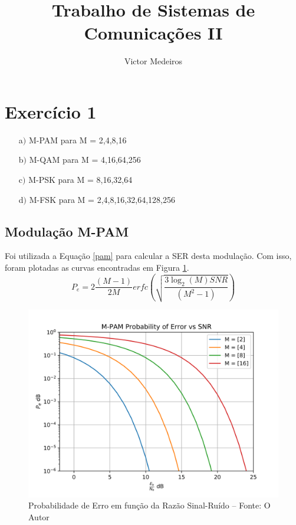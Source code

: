 \documentclass[10pt,two column,a4paper]{article}
\author{Victor Medeiros}
\title{Trabalho de Sistemas de Comunicações II}
\begin{document}
	\maketitle
	\section{Exercício 1}
	\begin{enumerate}
	\item[a$)$] M-PAM para M = 2,4,8,16
	\item[b$)$] M-QAM para M = 4,16,64,256
	\item[c$)$] M-PSK para M = 8,16,32,64
	\item[d$)$] M-FSK para M = 2,4,8,16,32,64,128,256\end{enumerate}	
	\subsection{Modulação M-PAM}
	Foi utilizada a Equação \eqref{pam} para calcular a SER desta modulação. Com isso, foram plotadas as curvas encontradas em Figura \ref{pamI}.
	\begin{equation}
	P_e  = 2\frac{(M-1)}{2M}erfc\left( \sqrt{ \frac{3\log_2(M)SNR}{(M^2-1)} }\right)\label{pam}
	\end{equation}
	\begin{figure}[h]\centering
		\includegraphics[width=\linewidth]{imagens_ex1/pam.png}\caption{Probabilidade de Erro em função da Razão Sinal-Ruído -- Fonte: O Autor}\label{pamI}
	\end{figure}
\end{document}
